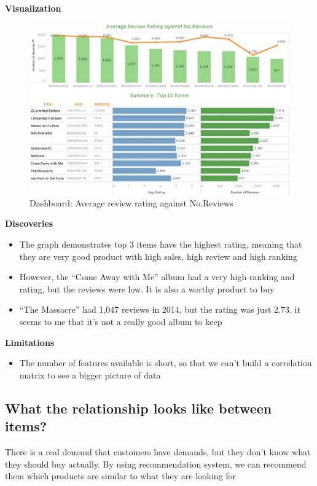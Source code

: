\documentclass[a4paper,11pt]{article}
\begin{document}
		
		\textbf{Visualization}
		\begin{figure}[H]
				\includegraphics[width=1\textwidth, center]{pic10}
				\caption{Dashboard: Average review rating against No.Reviews}
		\end{figure}	
		
		
		\textbf{Discoveries}
		\begin{itemize}
			\item The graph demonstrates top 3 items have the highest rating, meaning that they are very good product with high sales, high review and high ranking
			\item However, the “Come Away with Me” album had a very high ranking and rating, but the reviews were low. It is also a worthy product to buy
			\item “The Massacre” had 1,047 reviews in 2014, but the rating was just 2.73. it seems to me that it’s not a really good album to keep
		\end{itemize}
		
		
		\textbf{Limitations}
		\begin{itemize}
			\item The number of features available is short, so that we can’t build a correlation matrix to see a bigger picture of data
		\end{itemize}
	
	\subsection{What the relationship looks like between items?}
		There is a real demand that customers have demands, but they don’t know what they should buy actually. By using recommendation system, we can recommend them which products are similar to what they are looking for
		
\end{document}
